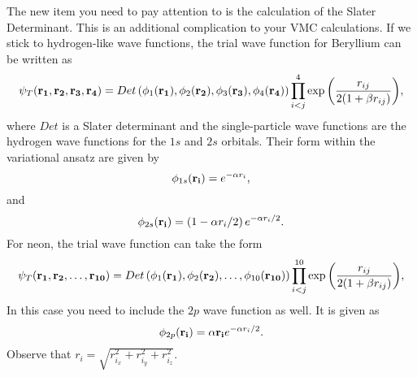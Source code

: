 \documentclass[10pt]{article}
\begin{document}
The new item you need to pay attention to is the calculation of the Slater Determinant. This is an additional complication
to your VMC calculations.
If we stick to hydrogen-like wave functions,
the trial wave function for Beryllium can be written as 
\begin{equation}
   \psi_{T}({\bf r_1},{\bf r_2}, {\bf r_3}, {\bf r_4}) = 
   Det\left(\phi_{1}({\bf r_1}),\phi_{2}({\bf r_2}),
   \phi_{3}({\bf r_3}),\phi_{4}({\bf r_4})\right)
   \prod_{i<j}^{4}\exp{\left(\frac{r_{ij}}{2(1+\beta r_{ij})}\right)}, 
\end{equation}
where $Det$ is a Slater determinant and the single-particle wave functions
are the hydrogen wave functions for the $1s$ and $2s$ orbitals. Their form
within the variational ansatz are given by
\begin{equation}
\phi_{1s}({\bf r_i}) = e^{-\alpha r_i},
\end{equation}
and 
\begin{equation}
\phi_{2s}({\bf r_i}) = \left(1-\alpha r_i/2\right)e^{-\alpha r_i/2}.
\end{equation}
For neon, the trial wave function can take the form
\begin{equation}
   \psi_{T}({\bf r_1},{\bf r_2}, \dots,{\bf r_{10}}) = 
   Det\left(\phi_{1}({\bf r_1}),\phi_{2}({\bf r_2}),
   \dots,\phi_{10}({\bf r_{10}})\right)
   \prod_{i<j}^{10}\exp{\left(\frac{r_{ij}}{2(1+\beta r_{ij})}\right)}, 
\end{equation}
In this case you need to include the $2p$ wave function as well.
It is given as
\begin{equation} 
\phi_{2p}({\bf r_i}) = \alpha {\bf r_i}e^{-\alpha r_i/2}.
\end{equation}
Observe that $r_i = \sqrt{r_{i_x}^2+r_{i_y}^2+r_{i_z}^2}$.
\end{document}
